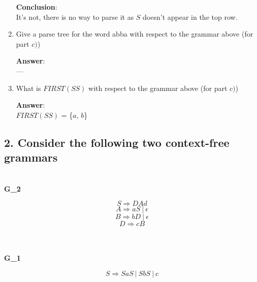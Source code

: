 \documentclass[a4paper, 14pt]{report}
\newcommand{\answer}[1]{%
	\textbf{Answer}:\\
	#1}
\newcommand{\question}[1]{\subsection*{#1}}
\begin{document}
\begin{enumerate}[label=(\alph*)]
{			\textbf{Conclusion}: \\
			It's not, there is no way to parse it as $S$ doesn't appear in the top row.
		}

	\item Give a parse tree for the word abba with respect to the grammar above (for part $c)$)

		\answer{%
			---
		}

	\item What is $FIRST(SS)$ with respect to the grammar above (for part $c)$)

		\answer{$FIRST(SS)$ = \{$a$, $b$\}}

\end{enumerate}		


\pagebreak

\question{2. Consider the following two context-free grammars}

\begin{multicols}{2}

	\begin{center} \textbf{\\G_{2}} \end{center}

	\[ S \Rightarrow DAd \]
	\[ A \Rightarrow aS\ |\ \epsilon \]
	\[ B \Rightarrow bD\ |\ \epsilon \]
	\[ D \Rightarrow cB \]

	\begin{center} \textbf{\\\\G_{1}} \end{center}

	\[ S \Rightarrow SaS\ |\ SbS\ |\ c \] \\

\end{multicols}
\end{document}
